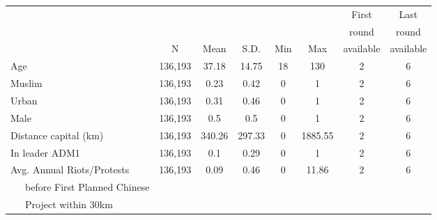  \begin{tabular}{l ccccccc} 
 &   &      &      &     &     & First     & Last     \\ 
  &   &      &      &     &     & round     & round    \\ 
  & N & Mean & S.D. & Min & Max & available & available \\ 
 \hline Age  &  136,193  &  37.18  &  14.75  &  18  &  130  &  2  &  6  \\ Muslim  &  136,193  &  0.23  &  0.42  &  0  &  1  &  2  &  6  \\ Urban  &  136,193  &  0.31  &  0.46  &  0  &  1  &  2  &  6  \\ Male  &  136,193  &  0.5  &  0.5  &  0  &  1  &  2  &  6  \\ Distance capital (km)  &  136,193  &  340.26  &  297.33  &  0  &  1885.55  &  2  &  6  \\ In leader ADM1  &  136,193  &  0.1  &  0.29  &  0  &  1  &  2  &  6  \\ Avg. Annual Riots/Protests  &  136,193  &  0.09  &  0.46  &  0  &  11.86  &  2  &  6  \\  ~~~before First Planned Chinese  & & & & & & & \\ 
  ~~~Project within 30km & & & & & & & \\ 
 \hline  \end{tabular}